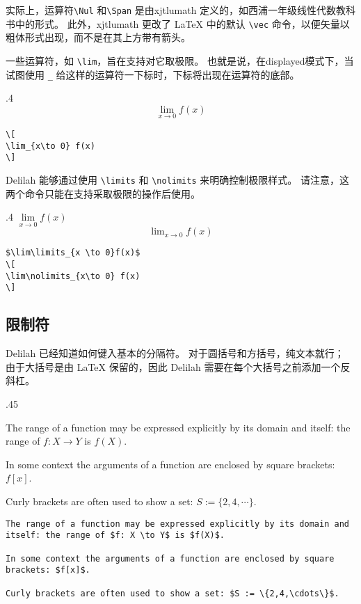 实际上，运算符\verb=\Nul= 和\verb=\Span= 是由xjtlumath 定义的，如西浦一年级线性代数教科书中的形式。 此外，xjtlumath 更改了 \LaTeX{} 中的默认 \verb=\vec= 命令，以便矢量以粗体形式出现，而不是在其上方带有箭头。

一些运算符，如 \verb=\lim=，旨在支持对它取极限。 也就是说，在displayed模式下，当试图使用 \verb=_= 给这样的运算符一下标时，下标将出现在运算符的底部。
\begin{parexammar}{.4\textandmarginlen}{
\[
\lim_{x\to 0} f(x)
\]
}
\begin{lstlisting}
\[
\lim_{x\to 0} f(x)
\]
\end{lstlisting}
\end{parexammar}

Delilah 能够通过使用 \verb=\limits= 和 \verb=\nolimits= 来明确控制极限样式。 请注意，这两个命令只能在支持采取极限的操作后使用。
\begin{parexammar}{.4\textandmarginlen}{
$\lim\limits_{x \to 0}f(x)$
\[
\lim\nolimits_{x\to 0} f(x)
\]
}
\begin{lstlisting}
$\lim\limits_{x \to 0}f(x)$
\[
\lim\nolimits_{x\to 0} f(x)
\]
\end{lstlisting}
\end{parexammar}

\subsection{限制符}
Delilah 已经知道如何键入基本的分隔符。 对于圆括号和方括号，纯文本就行； 由于大括号是由 \LaTeX{} 保留的，因此 Delilah 需要在每个大括号之前添加一个反斜杠。
\begin{parexammar}{.45\textandmarginlen}{
The range of a function may be expressed explicitly by its domain and itself: the range of $f: X \to Y$ is $f(X)$.

In some context the arguments of a function are enclosed by square brackets: $f[x]$.

Curly brackets are often used to show a set: $S := \{2,4,\cdots\}$.
}
\begin{lstlisting}
The range of a function may be expressed explicitly by its domain and itself: the range of $f: X \to Y$ is $f(X)$.

In some context the arguments of a function are enclosed by square brackets: $f[x]$.

Curly brackets are often used to show a set: $S := \{2,4,\cdots\}$.
\end{lstlisting}
\end{parexammar}

